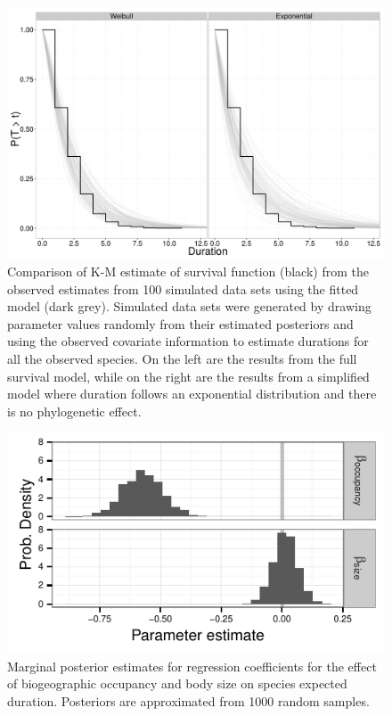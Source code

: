 \documentclass[12pt]{article}
\begin{document}
\clearpage


\begin{figure}[ht]
  \centering
  \includegraphics[height = 0.5\textheight, width = \textwidth, keepaspectratio = true]{figure/survival_function}
  \caption{Comparison of K-M estimate of survival function (black) from the observed estimates from 100 simulated data sets using the fitted model (dark grey). Simulated data sets were generated by drawing parameter values randomly from their estimated posteriors and using the observed covariate information to estimate durations for all the observed species. On the left are the results from the full survival model, while on the right are the results from a simplified model where duration follows an exponential distribution and there is no phylogenetic effect.}
  \label{fig:ppc_surv}
\end{figure}

\begin{figure}[ht]
  \centering
  \includegraphics[height = 0.5\textheight, width = \textwidth, keepaspectratio = true]{figure/other_est}
  \caption{Marginal posterior estimates for regression coefficients for the effect of biogeographic occupancy and body size on species expected duration. Posteriors are approximated from 1000 random samples.}
  \label{fig:eff_other}
\end{figure}
\end{document}
